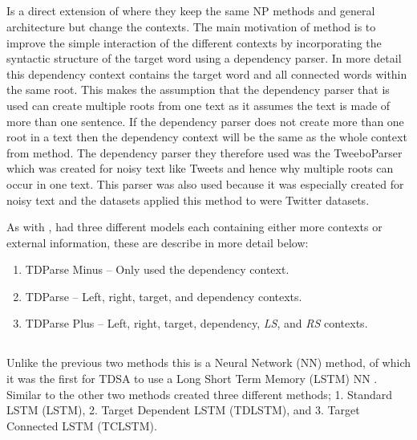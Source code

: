 \subsection{\cite{wang-etal-2017-tdparse}}
Is a direct extension of \cite{vo2015target} where they keep the same NP methods and general architecture but change the contexts. The main motivation of \citet{wang-etal-2017-tdparse} method is to improve the simple interaction of the different contexts by incorporating the syntactic structure of the target word using a dependency parser. In more detail this dependency context contains the target word and all connected words within the same root. This makes the assumption that the dependency parser that is used can create multiple roots from one text as it assumes the text is made of more than one sentence. If the dependency parser does not create more than one root in a text then the dependency context will be the same as the whole context from \citet{vo2015target} method. The dependency parser they therefore used was the TweeboParser \citep{kong-etal-2014-dependency} which was created for noisy text like Tweets and hence why multiple roots can occur in one text. This parser was also used because it was especially created for noisy text and the datasets \citet{wang-etal-2017-tdparse} applied this method to were Twitter datasets.

As with \citet{vo2015target}, \citet{wang-etal-2017-tdparse} had three different models each containing either more contexts or external information, these are describe in more detail below:
\begin{enumerate}
    \item TDParse Minus -- Only used the dependency context.
    \item TDParse -- Left, right, target, and dependency contexts.
    \item TDParse Plus -- Left, right, target, dependency, \textit{LS}, and \textit{RS} contexts.
\end{enumerate}

\subsection{\cite{tang-etal-2016-effective}}
Unlike the previous two methods this is a Neural Network (NN) method, of which it was the first for TDSA to use a Long Short Term Memory (LSTM) NN \citep{hochreiter1997long}. Similar to the other two methods \citet{tang-etal-2016-effective} created three different methods; 1. Standard LSTM (LSTM), 2. Target Dependent LSTM (TDLSTM), and 3. Target Connected LSTM (TCLSTM).\\

